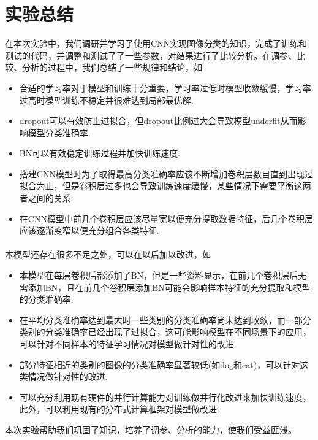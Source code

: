 \documentclass[11pt]{article}
\begin{document}
\section{实验总结}
在本次实验中，我们调研并学习了使用CNN实现图像分类的知识，完成了训练和测试的代码，并调整和测试了了一些参数，对结果进行了比较分析。在调参、比较、分析的过程中，我们总结了一些规律和结论，如
\begin{itemize}
    \item 合适的学习率对于模型和训练十分重要，学习率过低时模型收敛缓慢，学习率过高时模型训练不稳定并很难达到局部最优解.
    \item dropout可以有效防止过拟合，但dropout比例过大会导致模型underfit从而影响模型分类准确率.
    \item BN可以有效稳定训练过程并加快训练速度.
    \item 搭建CNN模型时为了取得最高分类准确率应该不断增加卷积层数目直到出现过拟合为止，但是卷积层过多也会导致训练速度缓慢，某些情况下需要平衡这两者之间的关系.
    \item 在CNN模型中前几个卷积层应该尽量宽以便充分提取数据特征，后几个卷积层应该逐渐变窄以便充分组合各类特征.
\end{itemize}
\paragraph{}本模型还存在很多不足之处，可以在以后加以改进，如
\begin{itemize}
    \item 本模型在每层卷积后都添加了BN，但是一些资料显示，在前几个卷积层后无需添加BN，且在前几个卷积层添加BN可能会影响样本特征的充分提取和模型的分类准确率.
    \item 在平均分类准确率达到最大时一些类别的分类准确率尚未达到收敛，而一部分类别的分类准确率已经出现了过拟合，这可能影响模型在不同场景下的应用，可以针对不同样本的特征学习情况对模型做针对性的改进.
    \item 部分特征相近的类别的图像的分类准确率显著较低(如dog和cat)，可以针对这类情况做针对性的改进.
    \item 可以充分利用现有硬件的并行计算能力对训练做并行化改进来加快训练速度，此外，可以利用现有的分布式计算框架对模型做改进.
\end{itemize}

本次实验帮助我们巩固了知识，培养了调参、分析的能力，使我们受益匪浅。

\nocite{*}


\end{document}
